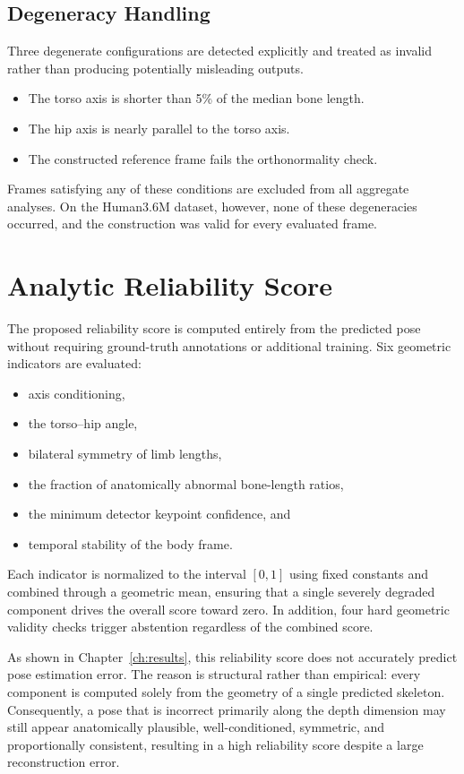 \documentclass[12pt,a4paper]{report}
\begin{document}
\subsection{Degeneracy Handling}

Three degenerate configurations are detected explicitly and treated as invalid rather than producing potentially misleading outputs.

\begin{itemize}
\item The torso axis is shorter than 5\% of the median bone length.
\item The hip axis is nearly parallel to the torso axis.
\item The constructed reference frame fails the orthonormality check.
\end{itemize}

Frames satisfying any of these conditions are excluded from all aggregate analyses. On the Human3.6M dataset, however, none of these degeneracies occurred, and the construction was valid for every evaluated frame.

\section{Analytic Reliability Score}

The proposed reliability score is computed entirely from the predicted pose without requiring ground-truth annotations or additional training. Six geometric indicators are evaluated:

\begin{itemize}
\item axis conditioning,
\item the torso--hip angle,
\item bilateral symmetry of limb lengths,
\item the fraction of anatomically abnormal bone-length ratios,
\item the minimum detector keypoint confidence, and
\item temporal stability of the body frame.
\end{itemize}

Each indicator is normalized to the interval $[0,1]$ using fixed constants and combined through a geometric mean, ensuring that a single severely degraded component drives the overall score toward zero. In addition, four hard geometric validity checks trigger abstention regardless of the combined score.

As shown in Chapter~\ref{ch:results}, this reliability score does not accurately predict pose estimation error. The reason is structural rather than empirical: every component is computed solely from the geometry of a single predicted skeleton. Consequently, a pose that is incorrect primarily along the depth dimension may still appear anatomically plausible, well-conditioned, symmetric, and proportionally consistent, resulting in a high reliability score despite a large reconstruction error.
\end{document}
